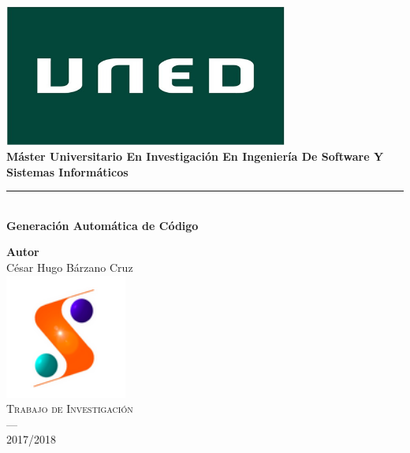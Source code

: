 \begin{titlepage}
 
 
\newlength{\centeroffset}
\setlength{\centeroffset}{-0.5\oddsidemargin}
\addtolength{\centeroffset}{0.5\evensidemargin}
\thispagestyle{empty}

\noindent\hspace*{\centeroffset}\begin{minipage}{\textwidth}

\centering
\includegraphics[width=0.7\textwidth]{imagenes/Logo-uned.jpg}\\[1.1cm]


{\Huge\bfseries Máster Universitario En Investigación En Ingeniería De Software Y Sistemas Informáticos\\
}
\noindent\rule[-1ex]{\textwidth}{3pt}\\[3.5ex]
{\large\bfseries Generación Automática de Código}
\end{minipage}

\vspace{2.5cm}
\noindent\hspace*{\centeroffset}\begin{minipage}{\textwidth}
\centering

\textbf{Autor}\\ {César Hugo Bárzano Cruz}\\[2.5ex]

\includegraphics[width=0.3\textwidth]{imagenes/Logo-master.png}\\[0.1cm]
\textsc{Trabajo de Investigación}\\
\textsc{---}\\
2017/2018
\end{minipage}
\end{titlepage}


